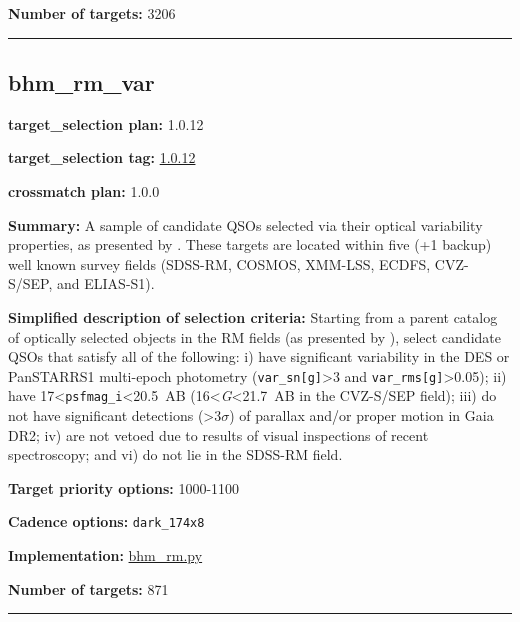 \noindent\textbf{Number of targets:} 3206

\begin{center}\rule{0.5\linewidth}{0.5pt}\end{center}

\hypertarget{bhm_rm_var_plan1.0.12}{%
\subsection{bhm\_rm\_var}\label{bhm_rm_var_plan1.0.12}}

\noindent\textbf{target\_selection plan:} 1.0.12

\noindent\textbf{target\_selection tag:}
\href{https://github.com/sdss/target_selection/tree/1.0.12/}{1.0.12}

\noindent\textbf{crossmatch plan:} 1.0.0

\noindent\textbf{Summary:} A sample of candidate QSOs selected via their optical
variability properties, as presented by
\citet{Yang2022}. These targets are located within five (+1 backup) well
known survey fields (SDSS-RM, COSMOS, XMM-LSS, ECDFS, CVZ-S/SEP, and
ELIAS-S1).

\noindent\textbf{Simplified description of selection criteria:} Starting from a
parent catalog of optically selected objects in the RM fields (as
presented by
\citealt{Yang2022}), select candidate QSOs that satisfy all of the
following: i) have significant variability in the DES or PanSTARRS1
multi-epoch photometry (\texttt{var\_sn{[}g{]}}\textgreater3 and
\texttt{var\_rms{[}g{]}}\textgreater0.05); ii) have
17\textless{}\texttt{psfmag\_i}\textless20.5~AB
(16\textless{}\emph{G}\textless21.7~AB in the CVZ-S/SEP field); iii) do
not have significant detections (\textgreater3$\sigma$) of parallax and/or
proper motion in Gaia DR2; iv) are not vetoed due to results of visual
inspections of recent spectroscopy; and vi) do not lie in the SDSS-RM
field.


\noindent\textbf{Target priority options:} 1000-1100

\noindent\textbf{Cadence options:} \texttt{dark\_174x8}

\noindent\textbf{Implementation:}
\href{https://github.com/sdss/target_selection/blob/1.0.12/python/target_selection/cartons/bhm_rm.py}{bhm\_rm.py}

\noindent\textbf{Number of targets:} 871

\begin{center}\rule{0.5\linewidth}{0.5pt}\end{center}

